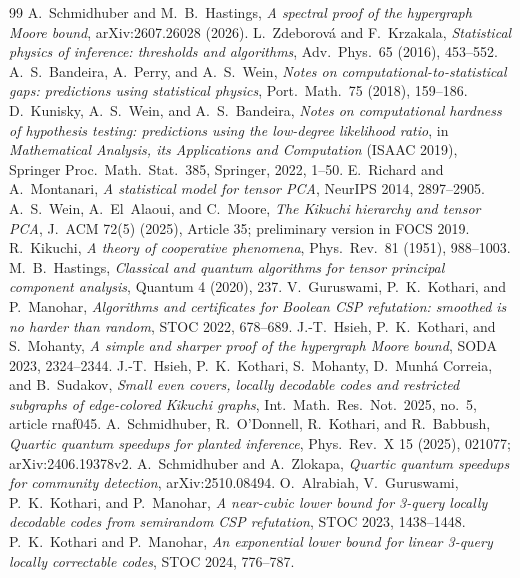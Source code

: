 \documentclass[11pt]{article}
\theoremstyle{definition}
\theoremstyle{remark}
\newcommand{\1}{\mathbf 1}
\numberwithin{equation}{section}
\begin{document}
\begin{thebibliography}{99}\small
{} A.~Schmidhuber and M.~B.~Hastings, \emph{A spectral proof of the hypergraph Moore bound}, arXiv:2607.26028 (2026).
 L.~Zdeborov\'a and F.~Krzakala, \emph{Statistical physics of inference: thresholds and algorithms}, Adv.\ Phys.\ 65 (2016), 453--552.
 A.~S.~Bandeira, A.~Perry, and A.~S.~Wein, \emph{Notes on computational-to-statistical gaps: predictions using statistical physics}, Port.\ Math.\ 75 (2018), 159--186.
 D.~Kunisky, A.~S.~Wein, and A.~S.~Bandeira, \emph{Notes on computational hardness of hypothesis testing: predictions using the low-degree likelihood ratio}, in \emph{Mathematical Analysis, its Applications and Computation} (ISAAC 2019), Springer Proc.\ Math.\ Stat.\ 385, Springer, 2022, 1--50.
 E.~Richard and A.~Montanari, \emph{A statistical model for tensor PCA}, NeurIPS 2014, 2897--2905.
 A.~S.~Wein, A.~El~Alaoui, and C.~Moore, \emph{The Kikuchi hierarchy and tensor PCA}, J.\ ACM 72(5) (2025), Article 35; preliminary version in FOCS 2019.
 R.~Kikuchi, \emph{A theory of cooperative phenomena}, Phys.\ Rev.\ 81 (1951), 988--1003.
 M.~B.~Hastings, \emph{Classical and quantum algorithms for tensor principal component analysis}, Quantum 4 (2020), 237.
 V.~Guruswami, P.~K.~Kothari, and P.~Manohar, \emph{Algorithms and certificates for Boolean CSP refutation: smoothed is no harder than random}, STOC 2022, 678--689.
 J.-T.~Hsieh, P.~K.~Kothari, and S.~Mohanty, \emph{A simple and sharper proof of the hypergraph Moore bound}, SODA 2023, 2324--2344.
 J.-T.~Hsieh, P.~K.~Kothari, S.~Mohanty, D.~Munh\'a Correia, and B.~Sudakov, \emph{Small even covers, locally decodable codes and restricted subgraphs of edge-colored Kikuchi graphs}, Int.\ Math.\ Res.\ Not.\ 2025, no.~5, article rnaf045.
 A.~Schmidhuber, R.~O'Donnell, R.~Kothari, and R.~Babbush, \emph{Quartic quantum speedups for planted inference}, Phys.\ Rev.\ X 15 (2025), 021077; arXiv:2406.19378v2.
 A.~Schmidhuber and A.~Zlokapa, \emph{Quartic quantum speedups for community detection}, arXiv:2510.08494.
 O.~Alrabiah, V.~Guruswami, P.~K.~Kothari, and P.~Manohar, \emph{A near-cubic lower bound for 3-query locally decodable codes from semirandom CSP refutation}, STOC 2023, 1438--1448.
 P.~K.~Kothari and P.~Manohar, \emph{An exponential lower bound for linear 3-query locally correctable codes}, STOC 2024, 776--787.

\end{thebibliography}
\end{document}
